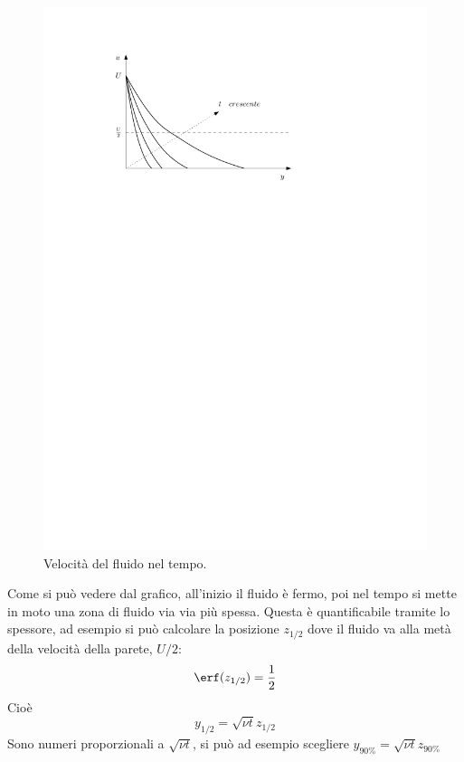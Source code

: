 	\begin{figure}[ht]
		\includegraphics[scale=0.9]{./3.6 Soluzioni esatte equazioni di Navier-Stokes/3.6-12}
		\centering
		\caption{Velocità del fluido nel tempo.}
	\end{figure}
%
Come si può vedere dal grafico, all'inizio il fluido è fermo, poi nel tempo si mette in moto una zona di fluido via via più spessa.
Questa è quantificabile tramite lo spessore, ad esempio si può calcolare la posizione $z_{1/2}$ dove il fluido va alla metà della velocità della parete, $U/2$:
%
	\begin{equation*}
		\erf(z_{1/2}) = \frac{1}{2}
	\end{equation*}
%
Cioè
%
	\begin{equation*}
		y_{1/2} = \sqrt{\nu t} z_{1/2}
	\end{equation*}
%
Sono numeri proporzionali a $\sqrt{\nu t}$, si può ad esempio scegliere $y_{90\%} = \sqrt{\nu t} z_{90 \%}$
